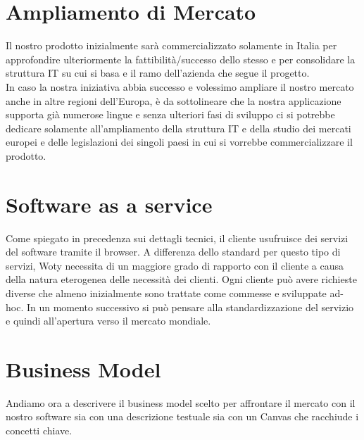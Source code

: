 \section{Ampliamento di Mercato}
Il nostro prodotto inizialmente sarà commercializzato solamente in Italia per approfondire ulteriormente la fattibilità/successo dello stesso e per consolidare la struttura IT su cui si basa e il ramo dell'azienda che segue il progetto.\\
In caso la nostra iniziativa abbia successo e volessimo ampliare il nostro mercato anche in altre regioni
dell'Europa, è da sottolineare che la nostra applicazione supporta già numerose lingue e senza ulteriori fasi
di sviluppo ci si potrebbe dedicare solamente all'ampliamento della struttura IT e della studio dei mercati
europei e delle legislazioni dei singoli paesi in cui si vorrebbe commercializzare il prodotto.

\section{Software as a service}
Come spiegato in precedenza sui dettagli tecnici, il cliente usufruisce dei servizi del software tramite il browser. A differenza dello standard per questo tipo di servizi, Woty necessita di un maggiore grado di rapporto con il cliente a causa della natura eterogenea delle necessità dei clienti. Ogni cliente può avere richieste diverse che almeno inizialmente sono trattate come commesse e sviluppate ad-hoc. In un momento successivo si può pensare alla standardizzazione del servizio e quindi all'apertura verso il mercato mondiale.




\section{Business Model}
Andiamo ora a descrivere il business model scelto per affrontare il mercato con il nostro software sia con una descrizione testuale sia con un Canvas che racchiude i concetti chiave.

